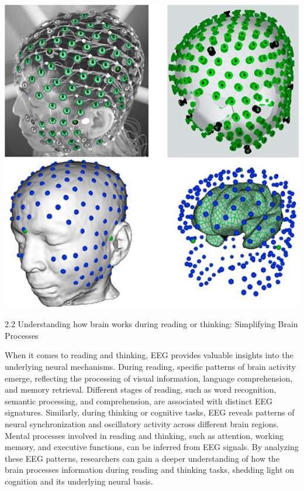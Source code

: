 \documentclass[11pt]{article}
\begin{document}
\begin{center}
\includegraphics[width=.9\linewidth]{../Figures/EEG_data_collection.jpg}
\end{center}

2.2 Understanding how brain works during reading or thinking: Simplifying Brain Processes
\begin{justify}
When it comes to reading and thinking, EEG provides valuable insights into the underlying neural mechanisms. During reading, specific patterns of brain activity emerge, reflecting the processing of visual information, language comprehension, and memory retrieval. Different stages of reading, such as word recognition, semantic processing, and comprehension, are associated with distinct EEG signatures. Similarly, during thinking or cognitive tasks, EEG reveals patterns of neural synchronization and oscillatory activity across different brain regions. Mental processes involved in reading and thinking, such as attention, working memory, and executive functions, can be inferred from EEG signals. By analyzing these EEG patterns, researchers can gain a deeper understanding of how the brain processes information during reading and thinking tasks, shedding light on cognition and its underlying neural basis.
\end{justify}
\end{document}
